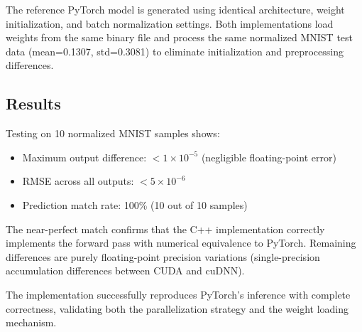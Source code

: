 \documentclass[11pt]{article}
\begin{document}
The reference PyTorch model is generated using identical architecture, weight initialization, and batch normalization settings. Both implementations load weights from the same binary file and process the same normalized MNIST test data (mean=0.1307, std=0.3081) to eliminate initialization and preprocessing differences.

\subsection{Results}

Testing on 10 normalized MNIST samples shows:
\begin{itemize}
    \item Maximum output difference: $< 1 \times 10^{-5}$ (negligible floating-point error)
    \item RMSE across all outputs: $< 5 \times 10^{-6}$
    \item Prediction match rate: 100\% (10 out of 10 samples)
\end{itemize}

The near-perfect match confirms that the C++ implementation correctly implements the forward pass with numerical equivalence to PyTorch. Remaining differences are purely floating-point precision variations (single-precision accumulation differences between CUDA and cuDNN).

The implementation successfully reproduces PyTorch's inference with complete correctness, validating both the parallelization strategy and the weight loading mechanism.

\newpage

\end{document}
